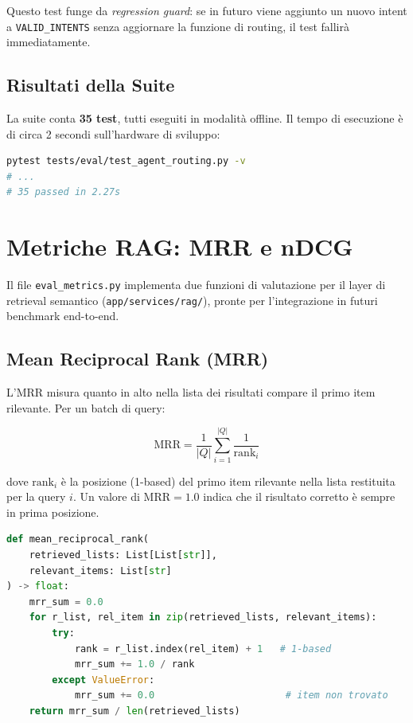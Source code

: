 Questo test funge da \emph{regression guard}: se in futuro viene
aggiunto un nuovo intent a \texttt{VALID\_INTENTS} senza aggiornare
la funzione di routing, il test fallirà immediatamente.

\subsection{Risultati della Suite}
\label{subsec:routing-results}

La suite conta \textbf{35 test}, tutti eseguiti in modalità offline.
Il tempo di esecuzione è di circa 2 secondi sull'hardware di sviluppo:

\begin{lstlisting}[language=bash, caption={Esecuzione e output della suite di routing}]
pytest tests/eval/test_agent_routing.py -v
# ...
# 35 passed in 2.27s
\end{lstlisting}

\section{Metriche RAG: MRR e nDCG}
\label{sec:eval-rag-metrics}

Il file \texttt{eval\_metrics.py} implementa due funzioni di valutazione
per il layer di retrieval semantico (\texttt{app/services/rag/}), pronte
per l'integrazione in futuri benchmark end-to-end.

\subsection{Mean Reciprocal Rank (MRR)}
\label{subsec:mrr}

L'MRR misura quanto in alto nella lista dei risultati compare il primo
item rilevante. Per un batch di query:

\[
\text{MRR} = \frac{1}{|Q|} \sum_{i=1}^{|Q|} \frac{1}{\text{rank}_i}
\]

dove $\text{rank}_i$ è la posizione (1-based) del primo item rilevante
nella lista restituita per la query $i$. Un valore di $\text{MRR} = 1.0$
indica che il risultato corretto è sempre in prima posizione.

\begin{lstlisting}[language=Python, caption={Implementazione MRR in \texttt{eval\_metrics.py}}]
def mean_reciprocal_rank(
    retrieved_lists: List[List[str]],
    relevant_items: List[str]
) -> float:
    mrr_sum = 0.0
    for r_list, rel_item in zip(retrieved_lists, relevant_items):
        try:
            rank = r_list.index(rel_item) + 1   # 1-based
            mrr_sum += 1.0 / rank
        except ValueError:
            mrr_sum += 0.0                       # item non trovato
    return mrr_sum / len(retrieved_lists)
\end{lstlisting}

